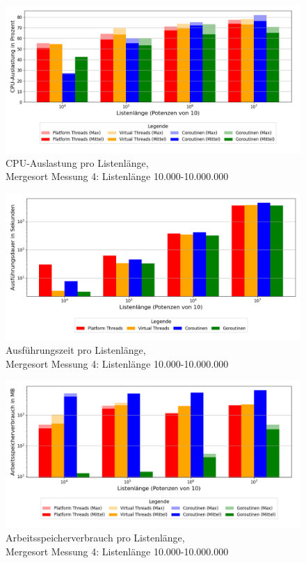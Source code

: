\documentclass[fontsize=12pt,paper=a4,twoside=semi,parskip=half-,headsepline,headinclude]{scrreprt}
\begin{document}
\begin{figure}[H]
	\centering
	\includegraphics[scale=0.5]{figures/mergesort/Listenlaenge/cpu_usage_bar_plot.png}
	\caption{CPU-Auslastung pro Listenlänge,\\ Mergesort Messung 4: Listenlänge 10.000-10.000.000}
	\label{fig:mslaengeCPU}
\end{figure}

\begin{figure}[H]
	\centering
	\includegraphics[scale=0.5]{figures/mergesort/Listenlaenge/execution_time_plot.png}
	\caption{Ausführungszeit pro Listenlänge,\\ Mergesort Messung 4: Listenlänge 10.000-10.000.000}
	\label{fig:mslaengeZeit}
\end{figure}

\begin{figure}[H]
	\centering
	\includegraphics[scale=0.5]{figures/mergesort/Listenlaenge/memory_usage_bar_plot.png}
	\caption{Arbeitsspeicherverbrauch pro Listenlänge,\\ Mergesort Messung 4: Listenlänge 10.000-10.000.000}
	\label{fig:mslaengeRAM}
\end{figure}
\end{document}
